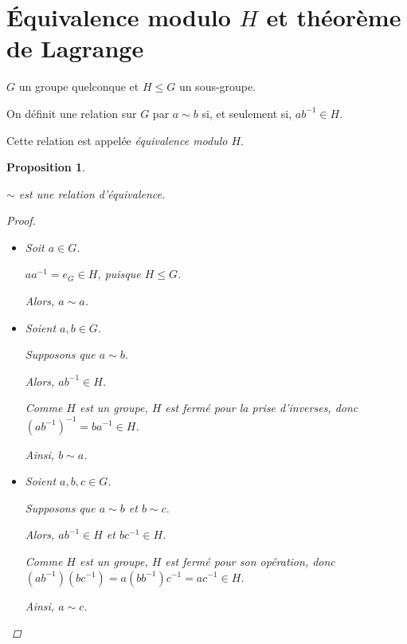 \documentclass{report}
\newcommand*{\lte}{\leqslant}
\newtheorem*{prop}{Proposition}
\theoremstyle{definition}
\theoremstyle{remark}
\begin{document}
	\section*{\'Equivalence modulo $H$ et th\'eor\`eme de Lagrange}
	$G$ un groupe quelconque et $H \lte G$ un sous-groupe.

	On d\'efinit une relation sur $G$ par $a \sim b$ si, et seulement si, $ab^{-1} \in H$.

	Cette relation est appel\'ee \emph{\'equivalence modulo $H$}.
	\begin{prop}~

		$\sim$ est une relation d'\'equivalence.
		\begin{proof}~

			\begin{itemize}
				\item[(refl)] Soit $a \in G$.

				$aa^{-1} = e_G \in H$, puisque $H \lte G$.

				Alors, $a \sim a$.
				\item[(sym)] Soient $a,b \in G$.

				Supposons que $a \sim b$.

				Alors, $ab^{-1} \in H$.

				Comme $H$ est un groupe, $H$ est ferm\'e pour la prise d'inverses, donc $(ab^{-1})^{-1} = ba^{-1} \in H$.

				Ainsi, $b \sim a$.
				\item[(trans)] Soient $a,b,c \in G$.

				Supposons que $a \sim b$ et $b \sim c$.

				Alors, $ab^{-1} \in H$ et $bc^{-1} \in H$.

				Comme $H$ est un groupe, $H$ est ferm\'e pour son op\'eration, donc $\left( ab^{-1} \right) \left( bc^{-1} \right) = a \left( bb^{-1} \right) c^{-1} = ac^{-1} \in H$.

				Ainsi, $a \sim c$.
			\end{itemize}
		\end{proof}
	\end{prop}
\end{document}
